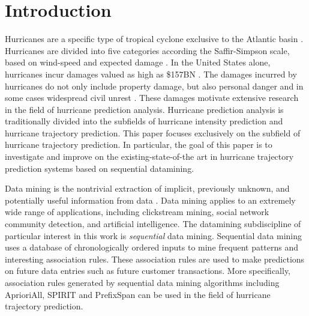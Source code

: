 \documentclass[12pt,conference]{IEEEtran}
\begin{document}
\IEEEpeerreviewmaketitle

\section{Introduction}

Hurricanes are a specific type of tropical cyclone exclusive to the Atlantic basin \cite{def-hurricane}. Hurricanes are divided into five categories according the Saffir-Simpson scale, based on wind-speed and expected damage \cite{hurricane-cat}. In the United States alone, hurricanes incur damages valued as high as \$157BN \cite{hurricane-cost}. The damages incurred by hurricanes do not only include property damage, but also personal danger and in some cases widespread civil unrest \cite{hurricane-cost-non-financial}. These damages motivate extensive research in the field of hurricane prediction analysis. Hurricane prediction analysis is traditionally divided into the subfields of hurricane intensity prediction and hurricane trajectory prediction. This paper focuses exclusively on the subfield of hurricane trajectory prediction. In particular, the goal of this paper is to investigate and improve on the existing-state-of-the art in hurricane trajectory prediction systems based on sequential datamining.

Data mining is the nontrivial extraction of implicit, previously unknown, and potentially useful information from data \cite{datamining-def}. Data mining applies to an extremely wide range of applications, including clickstream mining, social network community detection, and artificial intelligence. The datamining subdiscipline of particular interest in this work is \textit{sequential} data mining. Sequential data mining uses a database of chronologically ordered inputs to mine frequent patterns and interesting association rules. These association rules are used to make predictions on future data entries such as future customer transactions. More specifically, association rules generated by sequential data mining algorithms including AprioriAll, SPIRIT and PrefixSpan can be used in the field of hurricane trajectory prediction. 
\end{document}
